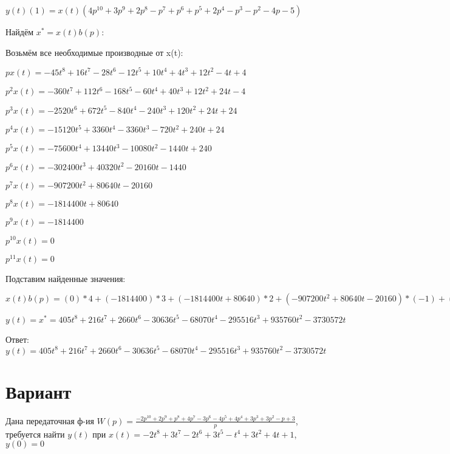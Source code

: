 \documentclass{article}
\begin{document}
{$y(t)(1)=x(t)(4p^{10}+3p^{9}+2p^{8}-p^{7}+p^{6}+p^{5}+2p^{4}-p^{3}-p^{2}-4p-5)$

Найдём $x^*=x(t)b(p)$:

Возьмём все необходимые производные от x(t):

$px(t)=-45t^{8}+16t^{7}-28t^{6}-12t^{5}+10t^{4}+4t^{3}+12t^{2}-4t+4$

$p^2x(t)=-360t^{7}+112t^{6}-168t^{5}-60t^{4}+40t^{3}+12t^{2}+24t-4$

$p^3x(t)=-2520t^{6}+672t^{5}-840t^{4}-240t^{3}+120t^{2}+24t+24$

$p^4x(t)=-15120t^{5}+3360t^{4}-3360t^{3}-720t^{2}+240t+24$

$p^5x(t)=-75600t^{4}+13440t^{3}-10080t^{2}-1440t+240$

$p^6x(t)=-302400t^{3}+40320t^{2}-20160t-1440$

$p^7x(t)=-907200t^{2}+80640t-20160$

$p^8x(t)=-1814400t+80640$

$p^9x(t)=-1814400$

$p^10x(t)=0$

$p^11x(t)=0$

Подставим найденные значения:

$x(t)b(p) = (0)*4+(-1814400)*3+(-1814400t+80640)*2+(-907200t^{2}+80640t-20160)*(-1)+(-302400t^{3}+40320t^{2}-20160t-1440)*1+(-75600t^{4}+13440t^{3}-10080t^{2}-1440t+240)*1+(-15120t^{5}+3360t^{4}-3360t^{3}-720t^{2}+240t+24)*2+(-2520t^{6}+672t^{5}-840t^{4}-240t^{3}+120t^{2}+24t+24)*(-1)+(-360t^{7}+112t^{6}-168t^{5}-60t^{4}+40t^{3}+12t^{2}+24t-4)*(-1)+(-45t^{8}+16t^{7}-28t^{6}-12t^{5}+10t^{4}+4t^{3}+12t^{2}-4t+4)*(-4)+(-45t^{8}+16t^{7}-28t^{6}-12t^{5}+10t^{4}+4t^{3}+12t^{2}-4t+4)*(-5)=405t^{8}+216t^{7}+2660t^{6}-30636t^{5}-68070t^{4}-295516t^{3}+935760t^{2}-3730572t$





$y(t)=x^*=405t^{8}+216t^{7}+2660t^{6}-30636t^{5}-68070t^{4}-295516t^{3}+935760t^{2}-3730572t$

Ответ: $y(t) = 405t^{8}+216t^{7}+2660t^{6}-30636t^{5}-68070t^{4}-295516t^{3}+935760t^{2}-3730572t$

\section{Вариант}

Дана передаточная ф-ия $W(p)=\frac{-2p^{10}+2p^{9}+p^{8}+4p^{7}-3p^{6}-4p^{5}+4p^{4}+3p^{3}+3p^{2}-p+3}{p}$, требуется найти $y(t)$ при $x(t)=-2t^{8}+3t^{7}-2t^{6}+3t^{5}-t^{4}+3t^{2}+4t+1$, $y(0)=0$

}
\end{document}
